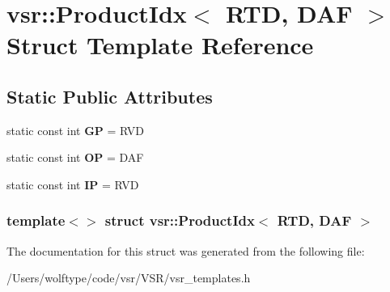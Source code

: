 \hypertarget{structvsr_1_1_product_idx_3_01_r_t_d_00_01_d_a_f_01_4}{\section{vsr\-:\-:Product\-Idx$<$ R\-T\-D, D\-A\-F $>$ Struct Template Reference}
\label{structvsr_1_1_product_idx_3_01_r_t_d_00_01_d_a_f_01_4}
}
\subsection*{Static Public Attributes}
\begin{DoxyCompactItemize}
\item 
\hypertarget{structvsr_1_1_product_idx_3_01_r_t_d_00_01_d_a_f_01_4_adb73542e4b998683fd4b2c467008090f}{static const int {\bfseries G\-P} = R\-V\-D}\label{structvsr_1_1_product_idx_3_01_r_t_d_00_01_d_a_f_01_4_adb73542e4b998683fd4b2c467008090f}

\item 
\hypertarget{structvsr_1_1_product_idx_3_01_r_t_d_00_01_d_a_f_01_4_a9967c337eb057a1e53aedd7ff6279455}{static const int {\bfseries O\-P} = D\-A\-F}\label{structvsr_1_1_product_idx_3_01_r_t_d_00_01_d_a_f_01_4_a9967c337eb057a1e53aedd7ff6279455}

\item 
\hypertarget{structvsr_1_1_product_idx_3_01_r_t_d_00_01_d_a_f_01_4_a152b8152dedbf2c564fe7048120b0911}{static const int {\bfseries I\-P} = R\-V\-D}\label{structvsr_1_1_product_idx_3_01_r_t_d_00_01_d_a_f_01_4_a152b8152dedbf2c564fe7048120b0911}

\end{DoxyCompactItemize}
\subsubsection*{template$<$$>$ struct vsr\-::\-Product\-Idx$<$ R\-T\-D, D\-A\-F $>$}



The documentation for this struct was generated from the following file\-:\begin{DoxyCompactItemize}
\item 
/\-Users/wolftype/code/vsr/\-V\-S\-R/vsr\-\_\-templates.\-h\end{DoxyCompactItemize}
